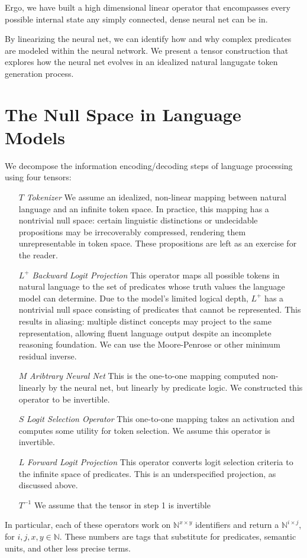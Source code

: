 \documentclass[12pt]{article}
\theoremstyle{plain}
\begin{document}
Ergo, we have built a high dimensional linear operator that encompasses
every possible internal state any simply connected, dense neural net can be in.

By linearizing the neural net, we can identify how and why
complex predicates are modeled within the neural network.  We present
a tensor construction that explores how the neural net evolves in
an idealized natural langugate token generation process.

\section{The Null Space in Language Models}
We decompose the information encoding/decoding steps of language processing
using four tensors:
\begin{enumerate}
\item[$T$] \emph{Tokenizer} We assume an idealized, non-linear mapping 
 between natural language and an infinite token space. In practice, this 
 mapping has a nontrivial null space: certain linguistic distinctions or 
undecidable propositions may be irrecoverably compressed, rendering them 
unrepresentable in token space.  These propositions are left as an
        exercise for the reader.
    \item[$L^+$] \emph{Backward Logit Projection} This operator maps all 
        possible tokens in natural language to the set of 
predicates whose truth values the language model can determine. Due to the model’s 
limited logical depth, $L^+$ has a nontrivial null space consisting of predicates 
that cannot be represented. This results in aliasing: multiple distinct concepts may 
project to the same representation, allowing fluent language output despite an 
incomplete reasoning foundation. We can use the Moore-Penrose or other minimum residual inverse.
    \item[$M$] \emph{Aribtrary Neural Net} This is the one-to-one mapping computed non-linearly by the neural net, 
    but linearly by predicate logic.  We constructed this operator to be invertible.
\item[$S$] \emph{Logit Selection Operator} This one-to-one mapping takes an activation and computes some utility for 
    token selection.  We assume this operator is invertible.
\item[$L$] \emph{Forward Logit Projection}  This operator converts logit selection criteria to the
    infinite space of predicates. This is an underspecified projection, as discussed above.
\item[$T^{-1}$] We assume that the tensor in step 1 is invertible
\end{enumerate}
In particular, each of these operators work on $\mathbb{N}^{x\times y}$ identifiers
and return a $\mathbb{N}^{i\times j}$, for $i,j,x,y\in\mathbb{N}$.  These numbers are tags 
that substitute for predicates, semantic units, and other less precise terms.
\end{document}
